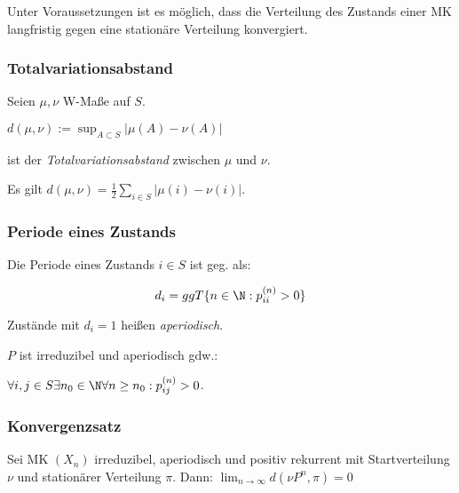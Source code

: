Unter Voraussetzungen ist es möglich, dass die Verteilung des Zustands einer MK langfristig gegen eine stationäre Verteilung konvergiert.

\subsubsection*{Totalvariationsabstand}

Seien $\mu, \nu$ W-Maße auf $S$.

$d(\mu, \nu) := \sup_{A \subset S} |\mu(A)-\nu(A)|$

ist der \emph{Totalvariationsabstand} zwischen $\mu$ und $\nu$.

\vspace*{1mm}

Es gilt $d(\mu,\nu) = \frac{1}{2} \sum_{i \in S} |\mu(i) - \nu(i)|$.

\subsubsection*{Periode eines Zustands}

Die Periode eines Zustands $i \in S$ ist geg. als:

\vspace*{-2mm}
$$d_i = ggT\{ n \in \N : p_{ii}^{(n)} > 0 \}$$

Zustände mit $d_i = 1$ heißen \emph{aperiodisch}.

$P$ ist irreduzibel und aperiodisch gdw.:

$\forall i, j \in S \exists n_0 \in \N \forall n \geq n_0 : p_{ij}^{(n)} > 0$.

\subsubsection*{Konvergenzsatz}

Sei MK $(X_n)$ irreduzibel, aperiodisch und positiv rekurrent mit Startverteilung $\nu$ und stationärer Verteilung $\pi$. Dann: $\lim_{n \to \infty} d(\nu P^n, \pi) = 0$
